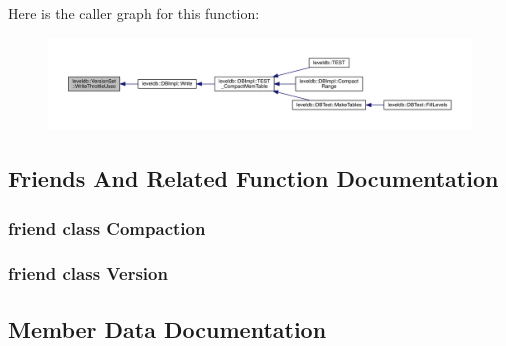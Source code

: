 Here is the caller graph for this function\+:\nopagebreak
\begin{figure}[H]
\begin{center}
\leavevmode
\includegraphics[width=350pt]{classleveldb_1_1_version_set_a703b7af8d375c8c2bc75ed02e26ee1c0_icgraph}
\end{center}
\end{figure}




\subsection{Friends And Related Function Documentation}
\hypertarget{classleveldb_1_1_version_set_a9372e882b35d27c78356228e4b758917}{}
\subsubsection[{Compaction}]{\setlength{\rightskip}{0pt plus 5cm}friend class {\bf Compaction}\hspace{0.3cm}{\ttfamily [friend]}}\label{classleveldb_1_1_version_set_a9372e882b35d27c78356228e4b758917}
\hypertarget{classleveldb_1_1_version_set_ace162f32d4abb584945d3a55a389b0a3}{}
\subsubsection[{Version}]{\setlength{\rightskip}{0pt plus 5cm}friend class {\bf Version}\hspace{0.3cm}{\ttfamily [friend]}}\label{classleveldb_1_1_version_set_ace162f32d4abb584945d3a55a389b0a3}


\subsection{Member Data Documentation}
\hypertarget{classleveldb_1_1_version_set_ac5b2015d9ea267679a5c0ccbc177a846}{}
